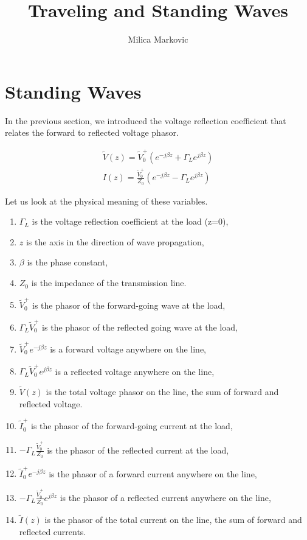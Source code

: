 \documentclass{ximera}
\title{Traveling and Standing Waves}
\author{Milica Markovic}
\begin{document}
  
\begin{abstract}  

\end{abstract}  
\maketitle    





\section{Standing Waves}


In the previous section, we introduced the voltage reflection coefficient that relates the forward to reflected voltage phasor.

\begin{eqnarray}
\tilde{V}(z)= \tilde{V}_0^+ (e^{-j \beta z} + \Gamma_L  e^{j \beta z }  ) \label{eq:vtlfin} \\
I(z)=   \frac{\tilde{V}_0^+}{Z_0}  (e^{-j \beta z} - \Gamma_L  e^{j \beta z}  ) \label{eq:itlfin}
\end{eqnarray}


 Let us look at the physical meaning of these variables.

\begin{enumerate}
\item $\Gamma_L$ is the voltage reflection coefficient at the load (z=0), 
\item $z$ is the axis in
the direction of wave propagation, 
\item $\beta$ is the phase
constant,
\item $Z_0$ is the impedance of the transmission line. 
\item $\tilde{V}_0^+$ is the phasor of the forward-going wave at the load,
\item $\Gamma _L \tilde{V}_0^+$ is the phasor of the reflected going wave at the load,
\item $\tilde{V}_0^+ e^{-j \beta z} $ is a forward voltage anywhere on the line, 
 \item $ \Gamma _L \tilde{V}_0^+ e^{j \beta z} $ is a reflected voltage anywhere on the line, 
\item $\tilde{V}(z)$ is the total voltage phasor on the line, the sum of forward and reflected voltage.
\item $\tilde{I}_0^+$ is the phasor of the forward-going current  at the load,
\item $-\Gamma _L \frac{\tilde{V}_0^+}{Z_0}$ is the phasor of the reflected current at the load,
\item $\tilde{I}_0^+ e^{-j \beta z} $ is the phasor of a forward current  anywhere on the line, 
 \item $-\Gamma _L \frac{\tilde{V}_0^+}{Z_0} e^{j \beta z} $ is the phasor of a reflected current anywhere on the line, 
\item $\tilde{I}(z)$ is the phasor of the total current on the line, the sum of forward and reflected currents.
\end{enumerate}
 
\end{document}
